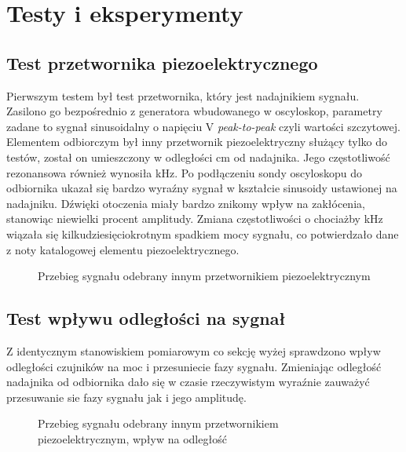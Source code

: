 \chapter[Testy i eksperymenty]{Testy i eksperymenty}

\label{chapter:testy}

\section{Test przetwornika piezoelektrycznego}
Pierwszym testem był test przetwornika, który jest nadajnikiem sygnału. Zasilono go bezpośrednio z generatora wbudowanego w oscyloskop, 
parametry zadane to sygnał sinusoidalny o napięciu \unit[5]{V} \textit{peak-to-peak} czyli wartości szczytowej.
Elementem odbiorczym był inny przetwornik piezoelektryczny służący tylko do testów, został on umieszczony w odległości \unit[10]{cm} od nadajnika. 
Jego częstotliwość rezonansowa również wynosiła \unit[40]{kHz}.
Po podłączeniu sondy oscyloskopu do odbiornika ukazał się bardzo wyraźny sygnał w kształcie sinusoidy ustawionej na nadajniku.
Dźwięki otoczenia miały bardzo znikomy wpływ na zakłócenia, stanowiąc niewielki procent amplitudy. 
Zmiana częstotliwości o chociażby \unit[1]{kHz} wiązała się kilkudziesięciokrotnym spadkiem mocy sygnału, co potwierdzało dane z noty katalogowej elementu piezoelektrycznego.
\begin{figure}[!ht]
    \centering
    \caption{Przebieg sygnału odebrany innym przetwornikiem piezoelektrycznym}
    \label{fig:oscylo_piezo}
\end{figure}

\section{Test wpływu odległości na sygnał}
Z identycznym stanowiskiem pomiarowym co sekcję wyżej sprawdzono wpływ odległości czujników na moc i przesuniecie fazy sygnału.
Zmieniając odległość nadajnika od odbiornika dało się w czasie rzeczywistym wyraźnie zauważyć przesuwanie sie fazy sygnału jak i jego amplitudę. 

\begin{figure}[!ht]
    \centering
    \caption{Przebieg sygnału odebrany innym przetwornikiem piezoelektrycznym, wpływ na odległość}
    \label{fig:oscylo_piezo2}
\end{figure}

